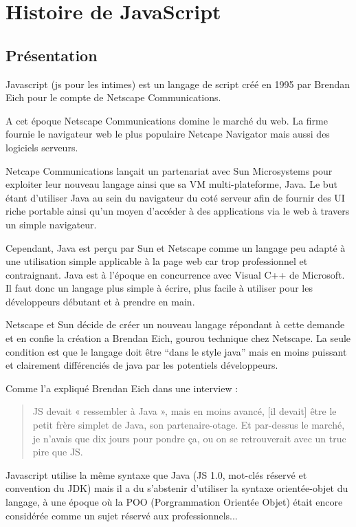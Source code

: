 \section{Histoire de JavaScript}
\label{ch:histoire}

\subsection{Présentation}


Javascript (js pour les intimes) est un langage de script créé en 1995 par Brendan Eich pour le compte de Netscape Communications.

A cet époque Netscape Communications domine le marché du web. La firme fournie le navigateur web le plus populaire Netcape Navigator mais aussi des logiciels serveurs.

Netcape Communications lançait un partenariat avec Sun Microsystems pour exploiter leur nouveau langage ainsi que sa VM multi-plateforme, Java. Le but étant d’utiliser Java au sein du navigateur du coté serveur afin de fournir des UI riche portable ainsi qu’un moyen d’accéder à des applications via le web à travers un simple navigateur.

Cependant, Java est perçu par Sun et Netscape comme un langage peu adapté à une utilisation simple applicable à la page web car trop professionnel et contraignant. Java est à l’époque en concurrence avec Visual C++ de Microsoft. Il faut donc un langage plus simple à écrire, plus facile à utiliser pour les développeurs débutant et à prendre en main.

Netscape et Sun décide de créer un nouveau langage répondant à cette demande et en confie la création a Brendan Eich, gourou technique chez Netscape. La seule condition est que le langage doit être “dans le style java”  mais en moins puissant et clairement différenciés de java par les potentiels développeurs.

Comme l’a expliqué Brendan Eich dans une interview :


\begin{quotation}


JS devait « ressembler à Java », mais en moins avancé, [il devait] être le petit frère simplet de Java, son partenaire-otage. Et par-dessus le marché, je n’avais que dix jours pour pondre ça, ou on se retrouverait avec un truc pire que JS.

\end{quotation}

Javascript utilise la même syntaxe que Java (JS 1.0, mot-clés réservé et convention du JDK) mais il a du s’abstenir d’utiliser la syntaxe orientée-objet du langage, à une époque où la POO (Porgrammation Orientée Objet) était encore considérée comme un sujet réservé aux professionnels...

